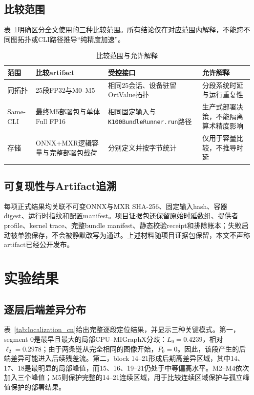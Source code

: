 \documentclass[conference]{IEEEtran}
\begin{document}
\subsection{比较范围}

表~\ref{tab:scope_cn}明确区分全文使用的三种比较范围。所有结论仅在对应范围内解释，不能跨不同图拓扑或CLI路径推导“纯精度加速”。

\begin{table}[t]
\caption{比较范围与允许解释}
\label{tab:scope_cn}
\centering
\small
\begin{tabular}{p{}p{}p{}p{}}
\toprule
范围 & 比较artifact & 受控接口 & 允许解释 \\
\midrule
同拓扑 & 25段FP32与M0--M5 & 相同25会话、设备驻留OrtValue拓扑 & 分段系统时延与运行重复性 \\
Same-CLI & 最终M5部署包与单体Full FP16 & 相同固定输入与\texttt{K100BundleRunner.run}路径 & 生产式部署决策，不能隔离算术精度影响 \\
存储 & ONNX+MXR逻辑容量与完整部署包载荷 & 分别定义并按字节统计 & 仅用于容量比较，不推导时延 \\
\bottomrule
\end{tabular}
\end{table}

\subsection{可复现性与Artifact追溯}

每项正式结果均关联不可变ONNX与MXR SHA-256、固定输入hash、容器digest、运行时指纹和配置manifest。项目证据包还保留原始时延数组、提供者profile、kernel trace、完整bundle manifest、静态校验receipt和排除账本；失败启动被单独保存，不会被静默改写为通过。上述材料随项目证据包保留，本文不声称artifact已经公开发布。

\section{实验结果}
\label{sec:results_cn}

\subsection{逐层后端差异分布}

表~\ref{tab:localization_cn}给出完整逐段定位结果，并显示三种关键模式。第一，segment 0是最早且最大的局部CPU--MIGraphX分歧：$L_0=0.4239$，相对$\ell_2=0.2978$；由于两条链从完全相同的图像开始，$P_0=0$。因此，该段产生的后端差异可能进入后续残差流。第二，block 14--21形成后期高差异区域，其中14、17、18是最明显的局部峰值，而15、16、19--21仍处于中等偏高水平。M2--M4依次加入三个峰值；M5则保护完整的14--21连续区域，用于比较连续区域保护与孤立峰值保护的部署结果。
\end{document}
